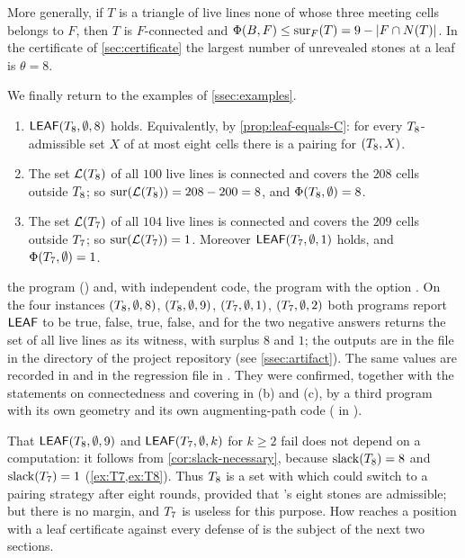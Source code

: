 More generally, if $T$ is a triangle of live lines none of whose three meeting cells belongs to $F$,
then $T$ is $F$-connected and $\Phi(B,F)\le\operatorname{sur}_F(T)=9-|F\cap N(T)|$. In the certificate of
\cref{sec:certificate} the largest number of unrevealed stones at a leaf is $\theta=8$.

We finally return to the examples of \cref{ssec:examples}.

\begin{fact}\label{fact:T8-leaf}
\begin{enumerate}[label=\textup{(\alph*)}]
\item $\mathsf{LEAF}(T_8,\emptyset,8)$ holds. Equivalently, by \cref{prop:leaf-equals-C}: for every
      $T_8$-admissible set $X$ of at most eight cells there is a pairing for $(T_8,X)$.
\item The set $\mathcal{L}(T_8)$ of all $100$ live lines is connected and covers the $208$ cells outside
      $T_8$; so $\operatorname{sur}(\mathcal{L}(T_8))=208-200=8$, and $\Phi(T_8,\emptyset)=8$.
\item The set $\mathcal{L}(T_7)$ of all $104$ live lines is connected and covers the $209$ cells outside
      $T_7$; so $\operatorname{sur}(\mathcal{L}(T_7))=1$. Moreover $\mathsf{LEAF}(T_7,\emptyset,1)$ holds, and
      $\Phi(T_7,\emptyset)=1$.
\end{enumerate}

\established the program  () and, with independent code, the
program  with the option . On the four instances
$(T_8,\emptyset,8)$, $(T_8,\emptyset,9)$, $(T_7,\emptyset,1)$, $(T_7,\emptyset,2)$ both
programs report $\mathsf{LEAF}$ to be true, false, true, false, and
for the two negative answers  returns the set of all live lines as its witness, with
surplus $8$ and $1$; the outputs are in the file  in the directory
 of the project repository (see \cref{ssec:artifact}). The same values are recorded in
 and in the regression file  in . They were confirmed,
together with the statements on connectedness and covering in (b) and (c), by a third program with its
own geometry and its own augmenting-path code ( in ).
\end{fact}

That $\mathsf{LEAF}(T_8,\emptyset,9)$ and $\mathsf{LEAF}(T_7,\emptyset,k)$ for $k\ge 2$ fail does not depend on a
computation: it follows from \cref{cor:slack-necessary}, because $\operatorname{slack}(T_8)=8$ and
$\operatorname{slack}(T_7)=1$ (\cref{ex:T7,ex:T8}). Thus $T_8$ is a set with which \Breaker{} could switch to a
pairing strategy after eight rounds, provided that \Maker's eight stones are admissible; but there is no
margin, and $T_7$ is useless for this purpose. How \Breaker{} reaches a position with a leaf
certificate against every defense of \Maker{} is the subject of the next two sections.

